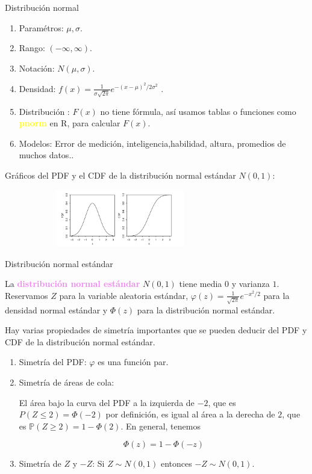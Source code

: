 \documentclass[10pt]{beamer}
\begin{document}
\begin{frame}{Distribuci\'on normal}
\small{
\begin{enumerate}
\item Param\'etros: $\mu, \sigma $.
\item Rango: $(-\infty, \infty )$.
\item Notaci\'on: $N(\mu, \sigma)$.
\item Densidad: $f(x) = \frac{1}{\sigma\sqrt{2\pi}} e^{-(x - \mu)^2/2\sigma^2}$ .
\item Distribuci\'on : $F(x)$ no tiene f\'ormula, as\'i usamos tablas o funciones como \textcolor{yellow}{\textbf{pnorm}} en R, para calcular $F(x)$.
\item Modelos: Error de medici\'on, inteligencia,habilidad, altura, promedios de muchos datos..
\end{enumerate}

Gr\'aficos del PDF y el CDF de la distribuci\'on  normal est\'andar $N(0,1)$:

\begin{figure}[ht]
\centering
\includegraphics[height=2.5cm, width=8cm]{R3.png}
\end{figure}
}
\end{frame}

\begin{frame}{Distribuci\'on normal est\'andar}
\small{
	
La \textcolor{violet}{\textbf{distribuci\'on normal est\'andar}} $N(0,1)$ tiene media $0$ y varianza $1$. Reservamos $Z$ para la variable aleatoria est\'andar, $\varphi(z) = \frac{1}{\sqrt{2\pi}}e^{-x^2/2}$ para la densidad normal est\'andar y $\Phi(z)$ para la distribuci\'on normal est\'andar.

Hay varias propiedades de simetr\'ia importantes que se pueden deducir del PDF y CDF de la distribuci\'on normal est\'andar.

\begin{enumerate}
\item Simetr\'ia del PDF: $\varphi $ es una funci\'on  par.
\item Simetr\'ia de \'areas de cola:

El \'area bajo la curva del PDF a la izquierda de $-2$, que es  $P(Z \leq 2) = \Phi(-2)$ por definici\'on, es igual al \'area a la derecha de $2$, que es $\mathbb{P}(Z \geq  2) = 1 -\Phi(2)$. En general, tenemos

\[
\Phi(z) =  1 -\Phi(-z)
\]

\item Simetr\'ia de $Z$ y $-Z$: Si $Z \sim N(0,1)$ entonces $-Z \sim N(0,1)$.
\end{enumerate}
}
\end{frame}
\end{document}
